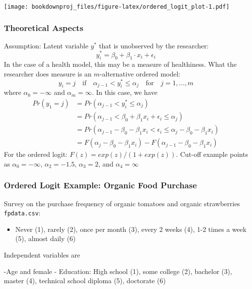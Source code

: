 \documentclass[
]{article}
\providecommand{\tightlist}{%
  \setlength{\itemsep}{0pt}\setlength{\parskip}{0pt}}
\begin{document}
\texttt{[image: bookdownproj\_files/figure-latex/ordered\_logit\_plot-1.pdf]}

\hypertarget{theoretical-aspects}{%
\subsubsection{Theoretical Aspects}\label{theoretical-aspects}}

Assumption: Latent variable \(y^*\) that is unobserved by the researcher:
\[y_i^* = \beta_0+\beta_1 \cdot x_i + \epsilon_i\]
In the case of a health model, this may be a measure of healthiness. What the researcher does measure is an \(m\)-alternative ordered model:
\[y_i = j \quad \text{if} \quad \alpha_{j-1} < y_i^* \leq \alpha_j \quad \text{for} \quad  j=1, \dots,m\]
where \(\alpha_0 = - \infty\) and \(\alpha_m=\infty\). In this case, we have
\[ \begin{align*}
    Pr(y_1 = j) &=Pr(\alpha_{j-1} < y_i^* \leq \alpha_j)\\
                &=Pr(\alpha_{j-1} < \beta_0+\beta_1 x_i + \epsilon_i \leq \alpha_j)\\
                &=Pr(\alpha_{j-1}- \beta_0-\beta_1 x_i < \epsilon_i \leq \alpha_j - \beta_0-\beta_1 x_i)\\
                        &=F(\alpha_j - \beta_0-\beta_1 x_i)-F(\alpha_{j-1} - \beta_0-\beta_1 x_i)
    \end{align*}\]
For the ordered logit: \(F(z)=exp(z)/(1+exp(z))\). Cut-off example points as \(\alpha_0 = -\infty\), \(\alpha_2 = -1.5\), \(\alpha_3 = 2\), and \(\alpha_4 = \infty\)

\hypertarget{ordered-logit-example-organic-food-purchase}{%
\subsubsection{Ordered Logit Example: Organic Food Purchase}\label{ordered-logit-example-organic-food-purchase}}

Survey on the purchase frequency of organic tomatoes and organic strawberries \texttt{fpdata.csv}:

\begin{itemize}
\tightlist
\item
  Never (1), rarely (2), once per month (3), every 2 weeks (4), 1-2 times a week (5), almost daily (6)
\end{itemize}

Independent variables are

-Age and female
- Education: High school (1), some college (2), bachelor (3), master (4), technical school diploma (5), doctorate (6)
\end{document}
